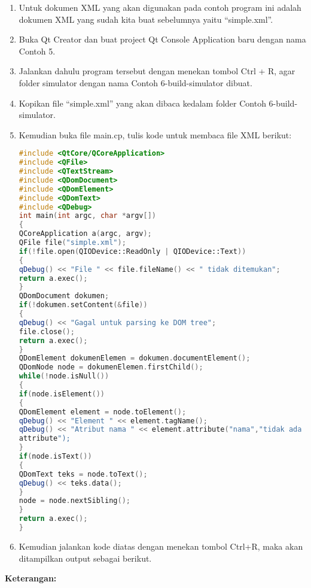 \begin{enumerate}

\item
  Untuk dokumen XML yang akan digunakan pada contoh program ini adalah
  dokumen XML yang sudah kita buat sebelumnya yaitu ``simple.xml''.
\item
  Buka Qt Creator dan buat project Qt Console Application baru dengan
  nama Contoh 5.
\item
  Jalankan dahulu program tersebut dengan menekan tombol Ctrl + R, agar
  folder simulator dengan nama Contoh 6-build-simulator dibuat.
\item
  Kopikan file ``simple.xml'' yang akan dibaca kedalam folder Contoh
  6-build-simulator.
\item
  Kemudian buka file main.cp, tulis kode untuk membaca file XML berikut:

\begin{lstlisting}[language=c++, numbers=none]
#include <QtCore/QCoreApplication>
#include <QFile>
#include <QTextStream>
#include <QDomDocument>
#include <QDomElement>
#include <QDomText>
#include <QDebug>
int main(int argc, char *argv[])
{
QCoreApplication a(argc, argv);
QFile file("simple.xml");
if(!file.open(QIODevice::ReadOnly | QIODevice::Text))
{
qDebug() << "File " << file.fileName() << " tidak ditemukan";
return a.exec();
}
QDomDocument dokumen;
if(!dokumen.setContent(&file))
{
qDebug() << "Gagal untuk parsing ke DOM tree";
file.close();
return a.exec();
}
QDomElement dokumenElemen = dokumen.documentElement();
QDomNode node = dokumenElemen.firstChild();
while(!node.isNull())
{
if(node.isElement())
{
QDomElement element = node.toElement();
qDebug() << "Element " << element.tagName();
qDebug() << "Atribut nama " << element.attribute("nama","tidak ada
attribute");
}
if(node.isText())
{
QDomText teks = node.toText();
qDebug() << teks.data();
}
node = node.nextSibling();
}
return a.exec();
}
\end{lstlisting}
\item
  Kemudian jalankan kode diatas dengan menekan tombol Ctrl+R, maka akan
  ditampilkan output sebagai berikut.
\end{enumerate}

\textbf{Keterangan:}

